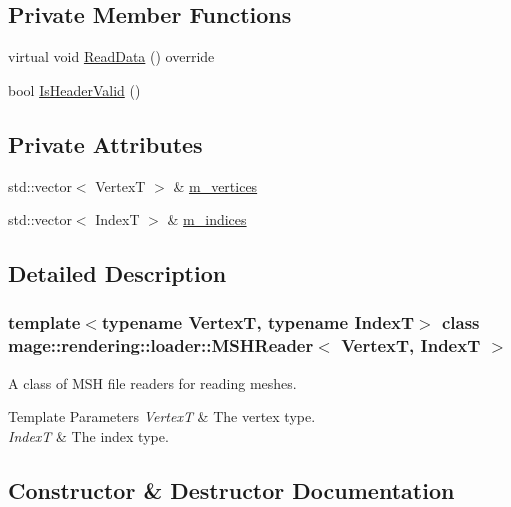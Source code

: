 \subsection*{Private Member Functions}
\begin{DoxyCompactItemize}
\item 
virtual void \mbox{\hyperlink{classmage_1_1rendering_1_1loader_1_1_m_s_h_reader_a99e8e3c50decb9332dc10bcdf7b6e00a}{Read\+Data}} () override
\item 
bool \mbox{\hyperlink{classmage_1_1rendering_1_1loader_1_1_m_s_h_reader_a7e6948dfb5f5c672719ebe10c4dae6bf}{Is\+Header\+Valid}} ()
\end{DoxyCompactItemize}
\subsection*{Private Attributes}
\begin{DoxyCompactItemize}
\item 
std\+::vector$<$ VertexT $>$ \& \mbox{\hyperlink{classmage_1_1rendering_1_1loader_1_1_m_s_h_reader_a57e5f4e14aecbce999df14d0dcaba4e5}{m\+\_\+vertices}}
\item 
std\+::vector$<$ IndexT $>$ \& \mbox{\hyperlink{classmage_1_1rendering_1_1loader_1_1_m_s_h_reader_acf3ae948f5bb927a167bbb2e5d618916}{m\+\_\+indices}}
\end{DoxyCompactItemize}


\subsection{Detailed Description}
\subsubsection*{template$<$typename VertexT, typename IndexT$>$\newline
class mage\+::rendering\+::loader\+::\+M\+S\+H\+Reader$<$ Vertex\+T, Index\+T $>$}

A class of M\+SH file readers for reading meshes.


\begin{DoxyTemplParams}{Template Parameters}
{\em VertexT} & The vertex type. \\
\hline
{\em IndexT} & The index type. \\
\hline
\end{DoxyTemplParams}


\subsection{Constructor \& Destructor Documentation}
\mbox{\label{classmage_1_1rendering_1_1loader_1_1_m_s_h_reader_adf50a71f368cd580433b3dab5ea3a1ac}} 
